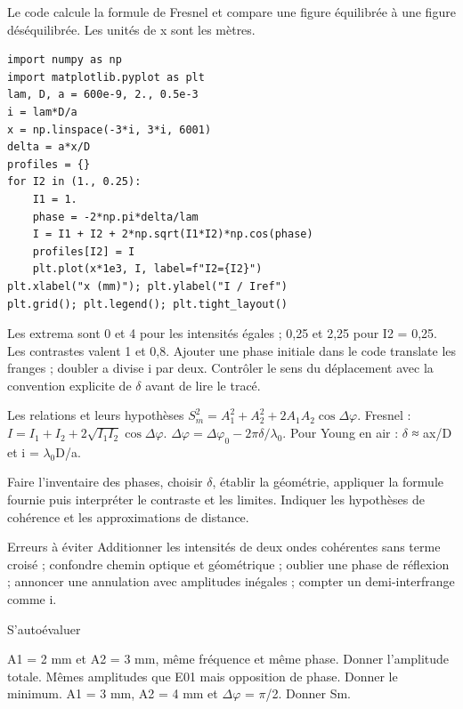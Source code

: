 Le code calcule la formule de Fresnel et compare une figure équilibrée à une figure déséquilibrée. Les unités de x sont les mètres.
\begin{verbatim}
import numpy as np
import matplotlib.pyplot as plt
lam, D, a = 600e-9, 2., 0.5e-3
i = lam*D/a
x = np.linspace(-3*i, 3*i, 6001)
delta = a*x/D
profiles = {}
for I2 in (1., 0.25):
    I1 = 1.
    phase = -2*np.pi*delta/lam
    I = I1 + I2 + 2*np.sqrt(I1*I2)*np.cos(phase)
    profiles[I2] = I
    plt.plot(x*1e3, I, label=f"I2={I2}")
plt.xlabel("x (mm)"); plt.ylabel("I / Iref")
plt.grid(); plt.legend(); plt.tight_layout()
\end{verbatim}
Les extrema sont 0 et 4 pour les intensités égales ; 0,25 et 2,25 pour I2 = 0,25. Les contrastes valent 1 et 0,8. Ajouter une phase initiale dans le code translate les franges ; doubler a divise i par deux. Contrôler le sens du déplacement avec la convention explicite de \ensuremath{\delta} avant de lire le tracé.


\begin{loi}{Les relations et leurs hypothèses}
$S_m^2=A_1^2+A_2^2+2A_1A_2\cos\Delta\varphi$. Fresnel : $I=I_1+I_2+2\sqrt{I_1I_2}\cos\Delta\varphi$. $\Delta\varphi=\Delta\varphi_0-2\pi\delta/\lambda_0$. Pour Young en air : \ensuremath{\delta} ≈ ax/D et i = \ensuremath{\lambda_0}D/a.
\end{loi}
Faire l’inventaire des phases, choisir \ensuremath{\delta}, établir la géométrie, appliquer la formule fournie puis interpréter le contraste et les limites. Indiquer les hypothèses de cohérence et les approximations de distance.
\begin{piege}{Erreurs à éviter}
Additionner les intensités de deux ondes cohérentes sans terme croisé ; confondre chemin optique et géométrique ; oublier une phase de réflexion ; annoncer une annulation avec amplitudes inégales ; compter un demi-interfrange comme i.
\end{piege}
\begin{docu}{S’autoévaluer}
\end{docu}


A1 = 2 mm et A2 = 3 mm, même fréquence et même phase. Donner l’amplitude totale.
Mêmes amplitudes que E01 mais opposition de phase. Donner le minimum.
A1 = 3 mm, A2 = 4 mm et \ensuremath{\Delta}\ensuremath{\varphi} = \ensuremath{\pi}/2. Donner Sm.


